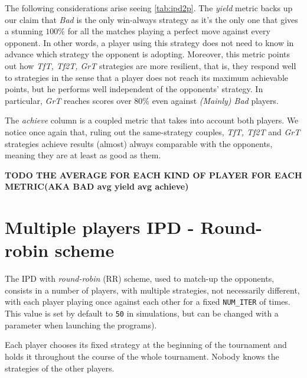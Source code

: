 \documentclass[journal,a4paper,10pt,twoside]{IEEEtran} %
\begin{document}

The following considerations arise seeing \autoref{tab:ipd2p}.
The \textit{yield} metric backs up our claim that \textit{Bad} is the only win-always strategy as it's the only one that gives a stunning $100\%$ for all the matches playing a perfect move against every opponent. In other words, a player using this strategy does not need to know in advance which strategy the opponent is adopting. Moreover, this metric points out how \textit{TfT, Tf2T, GrT} strategies are more resilient, that is, they respond well to strategies in the sense that a player does not reach its maximum achievable points, but he performs well independent of the opponents' strategy. In particular, \textit{GrT} reaches scores over $80\%$ even against \textit{(Mainly) Bad} players.

The \textit{achieve} column is a coupled metric that takes into account both players. We notice once again that, ruling out the same-strategy couples, \textit{TfT, Tf2T} and \textit{GrT} strategies achieve results (almost) always comparable with the opponents, meaning they are at least as good as them.

\textbf{TODO THE AVERAGE FOR EACH KIND OF PLAYER FOR EACH METRIC(AKA BAD avg yield avg achieve)}

\section{Multiple players IPD - Round-robin scheme} \label{s:IPDMP}
The IPD with \textit{round-robin} (RR) scheme, used to match-up the opponents, consists in a number of players, with multiple strategies, not necessarily different, with each player playing once against each other for a fixed \texttt{NUM\_ITER} of times. This value is set by default to \texttt{50} in simulations, but can be changed with a parameter when launching the programs).

Each player chooses its fixed strategy at the beginning of the tournament and holds it throughout the course of the whole tournament. Nobody knows the strategies of the other players.
\end{document}
